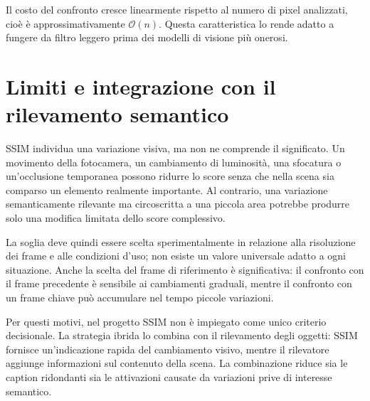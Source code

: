 Il costo del confronto cresce linearmente rispetto al numero di pixel
analizzati, cioè è approssimativamente \(\mathcal{O}(n)\). Questa caratteristica
lo rende adatto a fungere da filtro leggero prima dei modelli di visione più
onerosi.

\section{Limiti e integrazione con il rilevamento semantico}

SSIM individua una variazione visiva, ma non ne comprende il significato. Un
movimento della fotocamera, un cambiamento di luminosità, una sfocatura o
un'occlusione temporanea possono ridurre lo score senza che nella scena sia
comparso un elemento realmente importante. Al contrario, una variazione
semanticamente rilevante ma circoscritta a una piccola area potrebbe produrre
solo una modifica limitata dello score complessivo.

La soglia deve quindi essere scelta sperimentalmente in relazione alla
risoluzione dei frame e alle condizioni d'uso; non esiste un valore universale
adatto a ogni situazione. Anche la scelta del frame di riferimento è
significativa: il confronto con il frame precedente è sensibile ai cambiamenti
graduali, mentre il confronto con un frame chiave può accumulare nel tempo
piccole variazioni.

Per questi motivi, nel progetto SSIM non è impiegato come unico criterio
decisionale. La strategia ibrida lo combina con il rilevamento degli oggetti:
SSIM fornisce un'indicazione rapida del cambiamento visivo, mentre il rilevatore
aggiunge informazioni sul contenuto della scena. La combinazione riduce sia le
caption ridondanti sia le attivazioni causate da variazioni prive di interesse
semantico.

